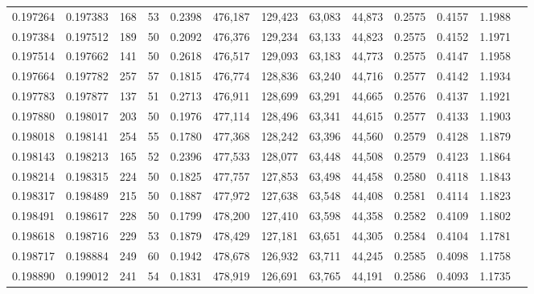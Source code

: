 \begin{tabular}{rrrrrrrrrrrrr}
0.197264 & 0.197383 &   168 &  53 &                                     0.2398 & 476,187 & 129,423 &  63,083 &  44,873 & 0.2575 & 0.4157 & 1.1988 \\
0.197384 & 0.197512 &   189 &  50 &                                     0.2092 & 476,376 & 129,234 &  63,133 &  44,823 & 0.2575 & 0.4152 & 1.1971 \\
0.197514 & 0.197662 &   141 &  50 &                                     0.2618 & 476,517 & 129,093 &  63,183 &  44,773 & 0.2575 & 0.4147 & 1.1958 \\
0.197664 & 0.197782 &   257 &  57 &                                     0.1815 & 476,774 & 128,836 &  63,240 &  44,716 & 0.2577 & 0.4142 & 1.1934 \\
0.197783 & 0.197877 &   137 &  51 &                                     0.2713 & 476,911 & 128,699 &  63,291 &  44,665 & 0.2576 & 0.4137 & 1.1921 \\
0.197880 & 0.198017 &   203 &  50 &                                     0.1976 & 477,114 & 128,496 &  63,341 &  44,615 & 0.2577 & 0.4133 & 1.1903 \\
0.198018 & 0.198141 &   254 &  55 &                                     0.1780 & 477,368 & 128,242 &  63,396 &  44,560 & 0.2579 & 0.4128 & 1.1879 \\
0.198143 & 0.198213 &   165 &  52 &                                     0.2396 & 477,533 & 128,077 &  63,448 &  44,508 & 0.2579 & 0.4123 & 1.1864 \\
0.198214 & 0.198315 &   224 &  50 &                                     0.1825 & 477,757 & 127,853 &  63,498 &  44,458 & 0.2580 & 0.4118 & 1.1843 \\
0.198317 & 0.198489 &   215 &  50 &                                     0.1887 & 477,972 & 127,638 &  63,548 &  44,408 & 0.2581 & 0.4114 & 1.1823 \\
0.198491 & 0.198617 &   228 &  50 &                                     0.1799 & 478,200 & 127,410 &  63,598 &  44,358 & 0.2582 & 0.4109 & 1.1802 \\
0.198618 & 0.198716 &   229 &  53 &                                     0.1879 & 478,429 & 127,181 &  63,651 &  44,305 & 0.2584 & 0.4104 & 1.1781 \\
0.198717 & 0.198884 &   249 &  60 &                                     0.1942 & 478,678 & 126,932 &  63,711 &  44,245 & 0.2585 & 0.4098 & 1.1758 \\
0.198890 & 0.199012 &   241 &  54 &                                     0.1831 & 478,919 & 126,691 &  63,765 &  44,191 & 0.2586 & 0.4093 & 1.1735 \\

\end{tabular}
